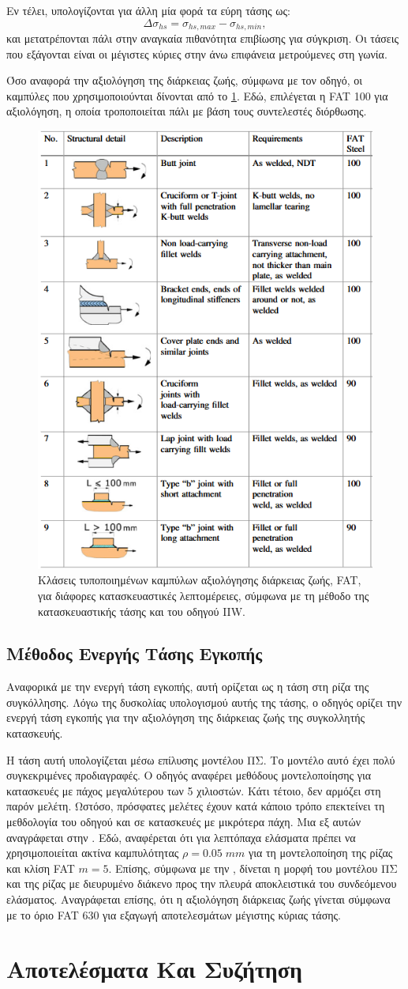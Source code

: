\documentclass{article}
\begin{document}
Εν τέλει, υπολογίζονται για άλλη μία φορά τα εύρη τάσης ως:
\begin{equation}
    \Delta \sigma_{hs} = \sigma_{hs,max} - \sigma_{hs,min},
\end{equation}
και μετατρέπονται πάλι στην αναγκαία πιθανότητα επιβίωσης για σύγκριση. Οι τάσεις που εξάγονται είναι οι μέγιστες κύριες στην άνω επιφάνεια μετρούμενες στη γωνία.
\par Όσο αναφορά την αξιολόγηση της διάρκειας ζωής, σύμφωνα με τον οδηγό, οι καμπύλες που χρησιμοποιούνται δίνονται από το \ref{fig:faths}. Εδώ, επιλέγεται η FAT 100 για αξιολόγηση, η οποία τροποποιείται πάλι με βάση τους συντελεστές διόρθωσης.
\begin{figure}[H]
    \centering
    \includegraphics[width = 0.45\linewidth]{media/hsfat.png}
    \caption{Κλάσεις τυποποιημένων καμπύλων αξιολόγησης διάρκειας ζωής, FAT, για διάφορες κατασκευαστικές λεπτομέρειες, σύμφωνα με τη μέθοδο της κατασκευαστικής τάσης και του οδηγού IIW.}
    \label{fig:faths}
\end{figure}


\subsection{Μέθοδος Ενεργής Τάσης Εγκοπής}
Αναφορικά με την ενεργή τάση εγκοπής, αυτή ορίζεται ως η τάση στη ρίζα της συγκόλλησης. Λόγω της δυσκολίας υπολογισμού αυτής της τάσης, ο οδηγός ορίζει την ενεργή τάση εγκοπής για την αξιολόγηση της διάρκειας ζωής της συγκολλητής κατασκευής. 
\par Η τάση αυτή υπολογίζεται μέσω επίλυσης μοντέλου ΠΣ. Το μοντέλο αυτό έχει πολύ συγκεκριμένες προδιαγραφές. Ο οδηγός αναφέρει μεθόδους μοντελοποίησης για κατασκευές με πάχος μεγαλύτερου των 5 χιλιοστών. Κάτι τέτοιο, δεν αρμόζει στη παρόν μελέτη. Ωστόσο, πρόσφατες μελέτες έχουν κατά κάποιο τρόπο επεκτείνει τη μεθδολογία του οδηγού και σε κατασκευές με μικρότερα πάχη. Μια εξ αυτών αναγράφεται στην \cite{BAUMGARTNER2020105844}. Εδώ, αναφέρεται ότι για λεπτόπαχα ελάσματα πρέπει να χρησιμοποιείται ακτίνα καμπυλότητας $\rho = 0.05 \;mm$ για τη μοντελοποίηση της ρίζας και κλίση FAT $m=5$. Επίσης, σύμφωνα με την \cite{malik}, δίνεται η μορφή του μοντέλου ΠΣ και της ρίζας με διευρυμένο διάκενο προς την πλευρά αποκλειστικά του συνδεόμενου ελάσματος. Αναγράφεται επίσης, ότι η αξιολόγηση διάρκειας ζωής γίνεται σύμφωνα με το όριο FAT 630 για εξαγωγή αποτελεσμάτων μέγιστης κύριας τάσης.

\section{Αποτελέσματα Και Συζήτηση}

\listoffigures
\listoftables



\printbibliography
\end{document}
